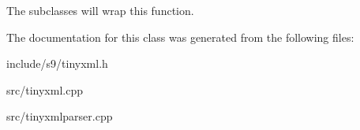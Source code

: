 The subclasses will wrap this function. 

The documentation for this class was generated from the following files\-:\begin{DoxyCompactItemize}
\item 
include/s9/tinyxml.\-h\item 
src/tinyxml.\-cpp\item 
src/tinyxmlparser.\-cpp\end{DoxyCompactItemize}
